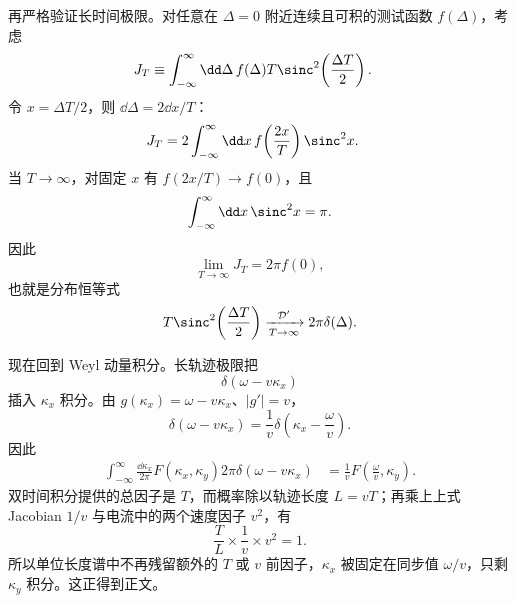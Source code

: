 \begin{derivation}[平面界面的混合表象与单位长度损失]
再严格验证长时间极限。对任意在 $\Delta=0$ 附近连续且可积的测试函数 $f(\Delta)$，考虑
\begin{align*}
 J_T
 &\equiv\int_{-\infty}^{\infty}\dd\Delta\,
 f(\Delta)
 T\sinc^2\!\left(\frac{\Delta T}{2}\right).
\end{align*}
令 $x=\Delta T/2$，则 $\dd\Delta=2\dd x/T$：
\begin{align*}
 J_T
 &=2\int_{-\infty}^{\infty}\dd x\,
 f\!\left(\frac{2x}{T}\right)
 \sinc^2x.
\end{align*}
当 $T\to\infty$，对固定 $x$ 有 $f(2x/T)\to f(0)$，且
\begin{equation*}
 \int_{-\infty}^{\infty}\dd x\,\sinc^2x=\pi.
\end{equation*}
因此
\begin{equation*}
 \lim_{T\to\infty}J_T
 =2\pi f(0),
\end{equation*}
也就是分布恒等式
\begin{equation*}
 T\sinc^2\!\left(\frac{\Delta T}{2}\right)
 \xrightarrow[T\to\infty]{\mathcal D'}
 2\pi\delta(\Delta).
\end{equation*}

现在回到 Weyl 动量积分。长轨迹极限把
\begin{equation*}
 \delta(\omega-v\kappa_x)
\end{equation*}
插入 $\kappa_x$ 积分。由 $g(\kappa_x)=\omega-v\kappa_x$、$|g'|=v$，
\begin{equation*}
 \delta(\omega-v\kappa_x)
 =\frac1v
 \delta\!\left(\kappa_x-\frac\omega v\right).
\end{equation*}
因此
\begin{align*}
 \int_{-\infty}^{\infty}\frac{\dd\kappa_x}{2\pi}
 F(\kappa_x,\kappa_y)
 2\pi\delta(\omega-v\kappa_x)
 &=\frac1v
 F\!\left(\frac\omega v,\kappa_y\right).
\end{align*}
双时间积分提供的总因子是 $T$，而概率除以轨迹长度 $L=vT$；再乘上上式 Jacobian $1/v$ 与电流中的两个速度因子 $v^2$，有
\begin{equation*}
 \frac{T}{L}\times\frac1v\times v^2
 =1.
\end{equation*}
所以单位长度谱中不再残留额外的 $T$ 或 $v$ 前因子，$\kappa_x$ 被固定在同步值 $\omega/v$，只剩 $\kappa_y$ 积分。这正得到正文。
\end{derivation}



